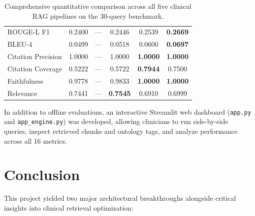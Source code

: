 \documentclass[11pt,a4paper]{article}
\begin{document}
\begin{table}[h!]
\begin{tabularx}{\textwidth}{l c c c c c}
ROUGE-L F1          & 0.2400 & --- & 0.2446 & 0.2539 & \textbf{0.2669} \\
BLEU-4              & 0.0499 & --- & 0.0518 & 0.0600 & \textbf{0.0697} \\
Citation Precision  & 1.0000 & --- & 1.0000 & \textbf{1.0000} & \textbf{1.0000} \\
Citation Coverage   & 0.5222 & --- & 0.5722 & \textbf{0.7944} & 0.7500 \\
Faithfulness        & 0.9778 & --- & 0.9833 & \textbf{1.0000} & \textbf{1.0000} \\
Relevance           & 0.7441 & --- & \textbf{0.7545} & 0.6910 & 0.6999 \\
\bottomrule
\end{tabularx}
\caption{Comprehensive quantitative comparison across all five clinical RAG pipelines on the 30-query benchmark.}
\end{table}

In addition to offline evaluations, an interactive Streamlit web dashboard (\texttt{app.py} and \texttt{app\_engine.py}) was developed, allowing clinicians to run side-by-side queries, inspect retrieved chunks and ontology tags, and analyze performance across all 16 metrics.

\section{Conclusion}
This project yielded two major architectural breakthroughs alongside critical insights into clinical retrieval optimization:
\end{document}
